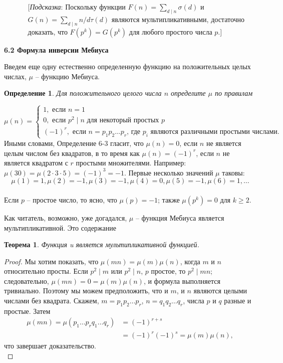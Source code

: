 \documentclass[11pt]{article}
\newtheorem{theorem}{Теорема}
\newtheorem{definition}{Определение}
\begin{document}
\begin{enumerate}
\begin{enumerate}
			[{\itshape Подсказка}: Поскольку функции $F(n)=\sum _{d\mid n}\sigma(d)$ и $G(n)=\sum _{d\mid n}n/d \tau(d) $ являются мультипликативными, достаточно доказать, что $F(p^{k})=G(p^{k})$ для любого простого числа $p$.]\\[5mm]
		\end{enumerate}
	\end{enumerate}
	
	\begin{flushleft}
		\LARGE {\textsf {\textbf {6.2 Формула инверсии Мебиуса}}}
	\end{flushleft}
	Введем еще одну естественно определенную функцию на положительных целых числах, $\mu $ -- функцию Мебиуса.
	
	\begin{definition}
		\label{Definition:1}
		Для положительного целого числа $n$ определите $\mu $ по правилам
	\end{definition}
	\[
	\mu(n) =
	\begin{cases}
	1,  \text{ если $n=1$} \\
	0,  \text{ если $p^{2}\mid n$ для некоторый простых $p$}\\
	(-1)^{r},  \text{ если $n=p_{1}p_{2}\ldots p_{r}$, где $p_{i}$ являются различными простыми числами.}
	\end{cases}
	\]
	Иными словами, Определение 6-3 гласит, что $\mu(n)=0$, если $n$ не является целым числом без квадратов, в то время как $\mu(n)=(-1)^{r}$, если $n$ не является квадратом с $r$ простыми множителями. Например: $\mu(30)=\mu(2\cdot3\cdot5)=(-1)^{3}=-1$. Первые несколько значений $\mu$ таковы:\\[1mm] \[\mu(1)=1,\mu(2)=-1,\mu(3)=-1,\mu(4)=0,\mu(5)=-1,\mu(6)=1,\ldots\]\\[1mm]
	Если $p$ -- простое число, то ясно, что $\mu(p) = - 1$; также $\mu(p^{k}) = 0$ для $k \ge 2$.
	
	Как читатель, возможно, уже догадался, $\mu$ -- функция Мебиуса является
	мультипликативной. Это содержание\\
	
	\begin{theorem}
		\label{Theorem:1}
		Функция u является мультипликативной функцией.
	\end{theorem}
	
	\begin{proof}
		Мы хотим показать, что $\mu(mn)=\mu(m)\mu(n)$, когда $m$ и $n$ относительно просты. Если $p^{2}\mid m$ или $p^{2}\mid n$, $p$ простое, то $p^{2}\mid mn$; следовательно,
		$\mu(mn)=0=\mu(m)\mu(n) $, и формула выполняется тривиально. Поэтому мы можем предположить, что и $m$, и $n$ являются целыми числами без квадрата. Скажем, $m = p_{1}p_{2}\ldots p_{r}$, $n = q_{1}q_{2}\ldots q_{r}$, числа $p$ и $q$ разные и простые. Затем 
		\begin{align*}
			\mu(mn)=\mu(p_{1}\ldots p_{r}q_{1}\ldots q_{r})&=(-1)^{r+s}\\
			&=(-1)^{r}(-1)^{s}=\mu(m)\mu(n),
		\end{align*}
		что завершает доказательство.\\
	\end{proof}
	
\end{document}
